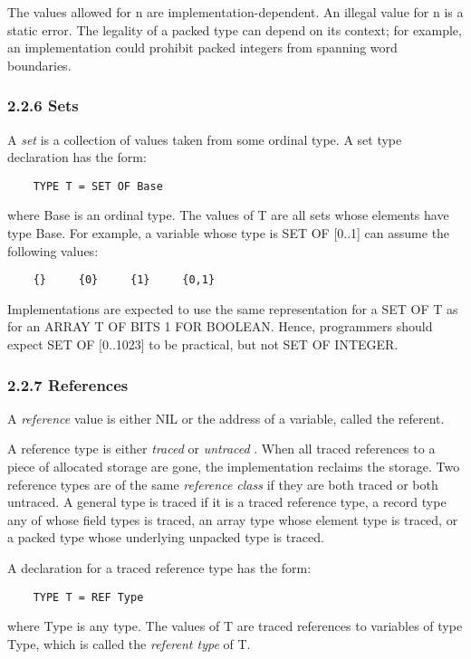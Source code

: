 \documentclass[10pt]{article}
\begin{document}
The values allowed for n are implementation-dependent. An illegal value for n
is a static error. The legality of a packed type can depend on its context;
for example, an implementation could prohibit packed integers from spanning
word boundaries.

\subsubsection*{2.2.6 Sets}

A \emph{set} is a collection of values taken from some ordinal type. A set
type declaration has the form:
\begin{verbatim}
    TYPE T = SET OF Base
\end{verbatim}
where Base is an ordinal type. The values of T are all sets whose elements
have type Base. For example, a variable whose type is SET OF [0..1] can assume
the following values:
\begin{verbatim}
    {}     {0}     {1}     {0,1}
\end{verbatim}

Implementations are expected to use the same representation for a SET OF T as for an ARRAY T OF BITS 1 FOR BOOLEAN. Hence, programmers should expect SET OF [0..1023] to be practical, but not SET OF INTEGER.

\subsubsection*{2.2.7 References}

A \emph{reference} value is either NIL or the address of a variable, called
the referent.

A reference type is either \emph{traced} or \emph{untraced} . When all traced
references to a piece of allocated storage are gone, the implementation
reclaims the storage. Two reference types are of the same \emph{reference
  class} if they are both traced or both untraced. A general type is traced if
it is a traced reference type, a record type any of whose field types is
traced, an array type whose element type is traced, or a packed type whose
underlying unpacked type is traced.

A declaration for a traced reference type has the form:
\begin{verbatim}
    TYPE T = REF Type
\end{verbatim}
where Type is any type. The values of T are traced references to variables of
type Type, which is called the \emph{referent type} of T.
\end{document}
